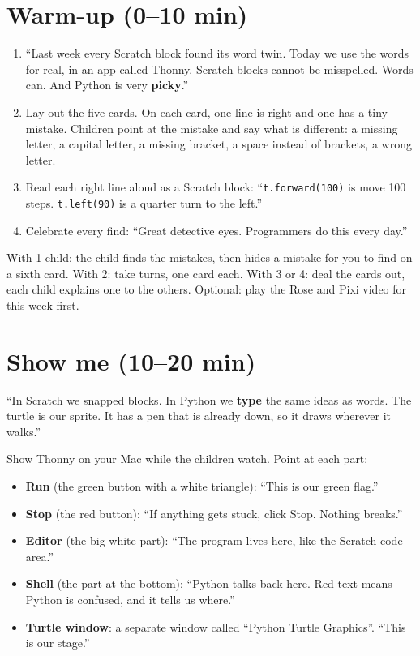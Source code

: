 \section{Warm-up (0--10 min)}
\begin{unplugged}
\begin{enumerate}[leftmargin=1.4em,itemsep=1pt]
  \item \enquote{Last week every Scratch block found its word twin. Today we use the words for real, in an app called Thonny. Scratch blocks cannot be misspelled. Words can. And Python is very \textbf{picky}.}
  \item Lay out the five cards. On each card, one line is right and one has a tiny mistake. Children point at the mistake and say what is different: a missing letter, a capital letter, a missing bracket, a space instead of brackets, a wrong letter.
  \item Read each right line aloud as a Scratch block: \enquote{\texttt{t.forward(100)} is move 100 steps. \texttt{t.left(90)} is a quarter turn to the left.}
  \item Celebrate every find: \enquote{Great detective eyes. Programmers do this every day.}
\end{enumerate}
With 1 child: the child finds the mistakes, then hides a mistake for you to find on a sixth card. With 2: take turns, one card each. With 3 or 4: deal the cards out, each child explains one to the others. Optional: play the Rose and Pixi video for this week first.
\end{unplugged}

\section{Show me (10--20 min)}
\begin{teacherscript}
\enquote{In Scratch we snapped blocks. In Python we \textbf{type} the same ideas as words. The turtle is our sprite. It has a pen that is already down, so it draws wherever it walks.}

Show Thonny on your Mac while the children watch. Point at each part:
\begin{itemize}[leftmargin=1.2em,itemsep=1pt]
  \item \textbf{Run} (the green button with a white triangle): \enquote{This is our green flag.}
  \item \textbf{Stop} (the red button): \enquote{If anything gets stuck, click Stop. Nothing breaks.}
  \item \textbf{Editor} (the big white part): \enquote{The program lives here, like the Scratch code area.}
  \item \textbf{Shell} (the part at the bottom): \enquote{Python talks back here. Red text means Python is confused, and it tells us where.}
  \item \textbf{Turtle window}: a separate window called \enquote{Python Turtle Graphics}. \enquote{This is our stage.}
\end{itemize}
\end{teacherscript}

